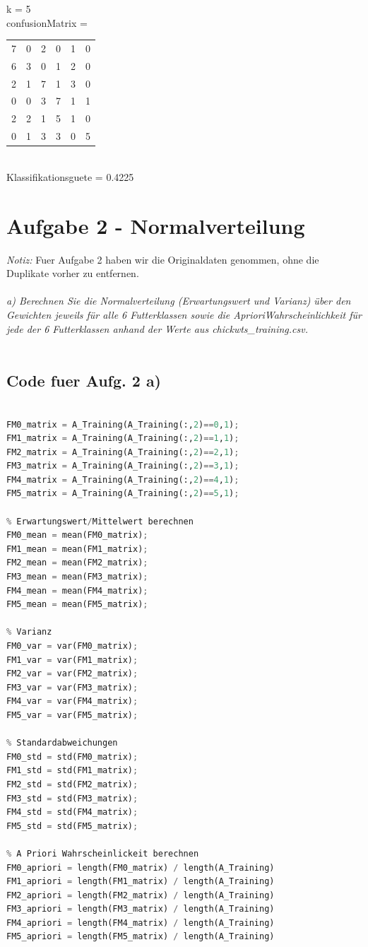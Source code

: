 \documentclass[12pt]{article}
\begin{document}
k = 5\\
confusionMatrix =\\
\begin{tabular}{ c c c c c c }
 7 & 0 & 2 & 0 & 1 & 0\\
 6 & 3 & 0 & 1 & 2 & 0\\
 2 & 1 & 7 & 1 & 3 & 0\\
 0 & 0 & 3 & 7 & 1 & 1\\
 2 & 2 & 1 & 5 & 1 & 0\\
 0 & 1 & 3 & 3 & 0 & 5\\
\end{tabular}\\
Klassifikationsguete = 0.4225\\



\section{Aufgabe 2 - Normalverteilung}
\textit{Notiz:} Fuer Aufgabe 2 haben wir die Originaldaten genommen, ohne die Duplikate vorher zu entfernen.\\
\\
\textit{a) Berechnen Sie die ​Normalverteilung​ (Erwartungswert und Varianz) über den Gewichten jeweils für alle 6 Futterklassen sowie die ​ A­priori­Wahrscheinlichkeit​ für jede der 6 Futterklassen anhand der Werte aus ​chickwts\_training.csv​.}\\
\\
\subsection{Code fuer Aufg. 2 a)}
\begin{lstlisting}[language=Python]
% Berechnungen fuer die 6 Futtermittel FM0..FM5:

FM0_matrix = A_Training(A_Training(:,2)==0,1);
FM1_matrix = A_Training(A_Training(:,2)==1,1);
FM2_matrix = A_Training(A_Training(:,2)==2,1);
FM3_matrix = A_Training(A_Training(:,2)==3,1);
FM4_matrix = A_Training(A_Training(:,2)==4,1);
FM5_matrix = A_Training(A_Training(:,2)==5,1);

% Erwartungswert/Mittelwert berechnen
FM0_mean = mean(FM0_matrix);
FM1_mean = mean(FM1_matrix);
FM2_mean = mean(FM2_matrix);
FM3_mean = mean(FM3_matrix);
FM4_mean = mean(FM4_matrix);
FM5_mean = mean(FM5_matrix);

% Varianz
FM0_var = var(FM0_matrix);
FM1_var = var(FM1_matrix);
FM2_var = var(FM2_matrix);
FM3_var = var(FM3_matrix);
FM4_var = var(FM4_matrix);
FM5_var = var(FM5_matrix);

% Standardabweichungen
FM0_std = std(FM0_matrix);
FM1_std = std(FM1_matrix);
FM2_std = std(FM2_matrix);
FM3_std = std(FM3_matrix);
FM4_std = std(FM4_matrix);
FM5_std = std(FM5_matrix);

% A Priori Wahrscheinlickeit berechnen
FM0_apriori = length(FM0_matrix) / length(A_Training)
FM1_apriori = length(FM1_matrix) / length(A_Training)
FM2_apriori = length(FM2_matrix) / length(A_Training)
FM3_apriori = length(FM3_matrix) / length(A_Training)
FM4_apriori = length(FM4_matrix) / length(A_Training)
FM5_apriori = length(FM5_matrix) / length(A_Training)
\end{lstlisting}
\end{document}
